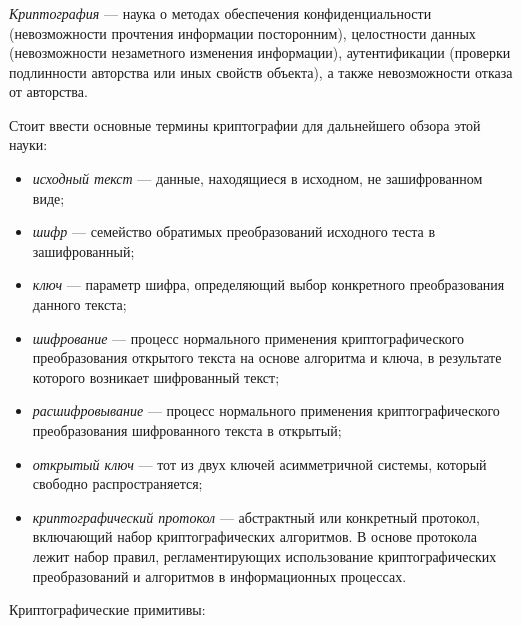 \subsubsection{}
\label{sec:analysis:research:crypto:general}

\emph{Криптография} --- наука о методах обеспечения конфиденциальности (невозможности прочтения информации посторонним), целостности данных (невозможности незаметного изменения информации), аутентификации (проверки подлинности авторства или иных свойств объекта), а также невозможности отказа от авторства\cite{wiki:crypto}.

Стоит ввести основные термины криптографии для дальнейшего обзора этой науки:

\begin{itemize}
	\item \emph{исходный текст} --- данные, находящиеся в исходном, не зашифрованном виде;
	\item \emph{шифр} --- семейство обратимых преобразований исходного теста в зашифрованный;
	\item \emph{ключ} --- параметр шифра, определяющий выбор конкретного преобразования данного текста;
	\item \emph{шифрование} --- процесс нормального применения криптографического преобразования открытого текста на основе алгоритма и ключа, в результате которого возникает шифрованный текст;
	\item \emph{расшифровывание} --- процесс нормального применения криптографического преобразования шифрованного текста в открытый;
	\item \emph{открытый ключ} --- тот из двух ключей асимметричной системы, который свободно распространяется;
	\item \emph{криптографический протокол} --- абстрактный или конкретный протокол, включающий набор криптографических алгоритмов. В основе протокола лежит набор правил, регламентирующих использование криптографических преобразований и алгоритмов в информационных процессах.
\end{itemize}

Криптографические примитивы:

